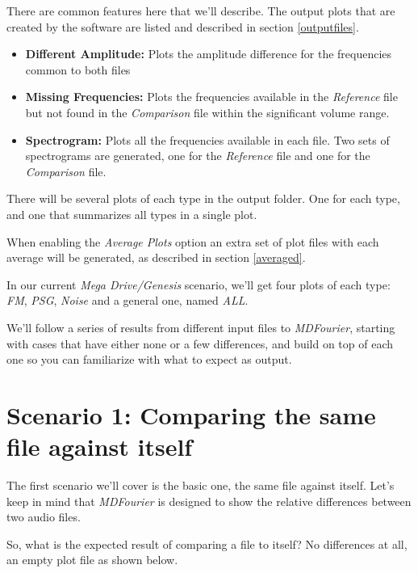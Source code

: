 \documentclass[10pt,a4paper]{report}
\begin{document}
There are common features here that we'll describe. The output plots that are created by the software are listed and described in section \ref{outputfiles}.

\begin{itemize}
	\item \textbf{Different Amplitude:} Plots the amplitude difference for the frequencies common to both files
	\item \textbf{Missing Frequencies:} Plots the frequencies available in the \textit{Reference} file but not found in the \textit{Comparison} file within the significant volume range.
	\item \textbf{Spectrogram:} Plots all the frequencies available in each file. Two sets of spectrograms are generated, one for the \textit{Reference} file and one for the \textit{Comparison} file.
\end{itemize}

There will be several plots of each type in the output folder. One for each type, and one that summarizes all types in a single plot.

When enabling the \textit{Average Plots} option an extra set of plot files with each average will be generated, as described in section \ref{averaged}.

In our current \textit{Mega Drive/Genesis} scenario, we'll get four plots of each type: \textit{FM}, \textit{PSG}, \textit{Noise} and a general one, named \textit{ALL}.

We'll follow a series of results from different input files to \textit{MDFourier}, starting with cases that have either none or a few differences, and build on top of each one so you can familiarize with what to expect as output.

\section{Scenario 1: Comparing the same file against itself}

The first scenario we'll cover is the basic one, the same file against itself. Let's keep in mind that \textit{MDFourier} is designed to show the relative differences between two audio files.

So, what is the expected result of comparing a file to itself? No differences at all, an empty plot file as shown below.
\end{document}
